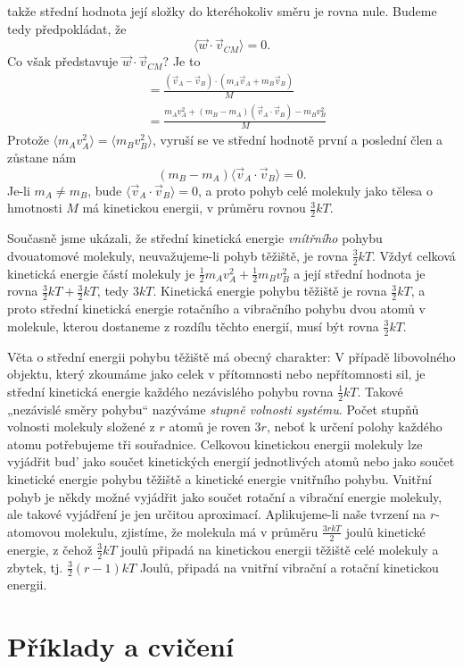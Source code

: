     takže střední hodnota její složky do kteréhokoliv směru je rovna nule. Budeme tedy předpokládat,
    že
    \begin{equation}\label{fyz:eq638}
      ⟨\vec{w}\cdot\vec{v}_{CM}⟩=0.
    \end{equation}
    Co však představuje \(\vec{w}\cdot\vec{v}_{CM}\)? Je to
    \begin{align}
        &= \frac{(\vec{v}_A−\vec{v}_B)⋅(m_A\vec{v}_A+m_B\vec{v}_B)}{M}                   \nonumber\\
        &= \frac{m_Av^2_A+(m_B−m_A)(\vec{v}_A\cdot\vec{v}_B)−m_Bv^2_B}{M}          \label{fyz:eq637}
    \end{align}
    Protože \(⟨m_Av^2_A⟩=⟨m_Bv^2_B⟩\), vyruší se ve střední hodnotě první a poslední člen a zůstane
    nám
    \begin{equation}\label{fyz:eq639}
      (m_B−m_A)⟨\vec{v}_A\cdot\vec{v}_B⟩=0.
    \end{equation}
    Je-li \(m_A≠m_B\), bude \(⟨\vec{v}_A\cdot\vec{v}_B⟩=0\), a proto pohyb celé molekuly jako tělesa
    o hmotnosti \(M\) má kinetickou energii, v průměru rovnou \(\frac{3}{2}kT\).

    Současně jsme ukázali, že střední kinetická energie \emph{vnítřního} pohybu dvouatomové
    molekuly, neuvažujeme-li pohyb těžiště, je rovna \(\frac{3}{2}kT\). Vždyť celková kinetická
    energie částí molekuly je \(\frac{1}{2}m_Av^2_A+\frac{1}{2}m_Bv^2_B\) a její střední hodnota je
    rovna \(\frac{3}{2}kT + \frac{3}{2}kT\), tedy \(3kT\). Kinetická energie pohybu těžiště je rovna
    \(\frac{3}{2}kT\), a proto střední kinetická energie rotačního a vibračního pohybu dvou atomů v
    molekule, kterou dostaneme z rozdílu těchto energií, musí být rovna \(\frac{3}{2}kT\).

    Věta o střední energii pohybu těžiště má obecný charakter: V případě libovolného objektu, který
    zkoumáme jako celek v přítomnosti nebo nepřítomnosti sil, je střední kinetická energie každého
    nezávislého pohybu rovna \(\frac{1}{2}kT\). Takové „nezávislé směry pohybu“ nazýváme
    \emph{stupně volnosti systému}. Počet stupňů volnosti molekuly složené z \(r\) atomů je roven
    \(3r\), neboť k určení polohy každého atomu potřebujeme tři souřadnice. Celkovou kinetickou
    energii molekuly lze vyjádřit bud' jako součet kinetických energií jednotlivých atomů nebo jako
    součet kinetické energie pohybu těžiště a kinetické energie vnitřního pohybu. Vnitřní pohyb je
    někdy možné vyjádřit jako součet rotační a vibrační energie molekuly, ale takové vyjádření je
    jen určitou aproximací. Aplikujeme-li naše tvrzení na \(r\)-atomovou molekulu, zjistíme, že
    molekula má v průměru \(\frac{3rkT}{2}\) joulů kinetické energie, z čehož \(\frac{3}{2}kT\)
    joulů připadá na kinetickou energii těžiště celé molekuly a zbytek, tj. \(\frac{3}{2}(r-1)kT\)
    Joulů, připadá na vnitřní vibrační a rotační kinetickou energii.

  \section{Příklady a cvičení}\label{fyz:IchapIXLsecVI}

